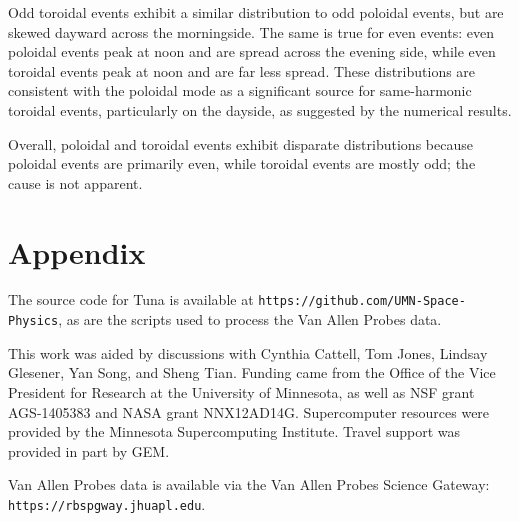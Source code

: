 \documentclass[draft,linenumbers]{agujournal}
\begin{document}
Odd toroidal events exhibit a similar distribution to odd poloidal events, but are skewed dayward across the morningside. The same is true for even events: even poloidal events peak at noon and are spread across the evening side, while even toroidal events peak at noon and are far less spread. These distributions are consistent with the poloidal mode as a significant source for same-harmonic toroidal events, particularly on the dayside, as suggested by the numerical results.

Overall, poloidal and toroidal events exhibit disparate distributions because poloidal events are primarily even, while toroidal events are mostly odd; the cause is not apparent.




\appendix

\section{Appendix}

The source code for Tuna is available at \texttt{https://github.com/UMN-Space-Physics}, as are the scripts used to process the Van Allen Probes data.


\acknowledgments

This work was aided by discussions with Cynthia Cattell, Tom Jones, Lindsay Glesener, Yan Song, and Sheng Tian. Funding came from the Office of the Vice President for Research at the University of Minnesota, as well as NSF grant AGS-1405383 and NASA grant NNX12AD14G. Supercomputer resources were provided by the Minnesota Supercomputing Institute. Travel support was provided in part by GEM.

Van Allen Probes data is available via the Van Allen Probes Science Gateway: \texttt{https://rbspgway.jhuapl.edu}.
\end{document}
